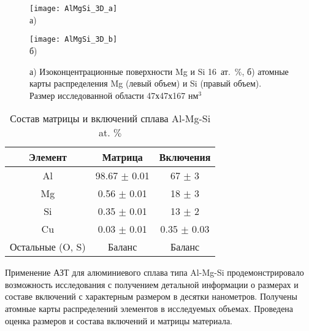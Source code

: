 \begin{figure}[htbp]
	\begin{minipage}[b][][b]{0.49\textwidth}\centering
		\texttt{[image: AlMgSi\_3D\_a]} \\ а)
	\end{minipage}
	\begin{minipage}[b][][b]{0.49\textwidth}\centering
		\texttt{[image: AlMgSi\_3D\_b]} \\ б)
	\end{minipage}
	\caption{а) Изоконцентрационные поверхности Mg и Si 16~ат.~$\%$, б) атомные карты распределения Mg (левый объем) и Si (правый объем). Размер исследованной области 47х47х167 нм$^3$}
	\label{fig:AlMgSi_3D}
\end{figure} 

\begin{table} [htbp]
	\centering
	\caption{Состав матрицы и включений сплава Al-Mg-Si at. $\%$}%
	\label{tab:AlMgSi_table}%
	\begin{SingleSpace}
		\begin{tabular}{| c | c | c |}
			\hline
			Элемент & Матрица & Включения \\ \hline
			Al & 98.67 $\pm$ 0.01 & 67 $\pm$ 3 \\ \hline
			Mg & 0.56 $\pm$ 0.01 & 18 $\pm$ 3 \\ \hline
			Si & 0.35 $\pm$ 0.01 & 13 $\pm$ 2 \\ \hline						
			Cu & 0.03 $\pm$ 0.01 & 0.35 $\pm$ 0.03\\ \hline
			Остальные (O, S) & Баланс & Баланс \\ \hline			
		\end{tabular}%
	\end{SingleSpace}
\end{table}

Применение АЗТ для алюминиевого сплава типа Al-Mg-Si продемонстрировало возможность исследования с получением детальной информации о размерах и составе включений с характерным размером в десятки нанометров. Получены атомные карты распределений элементов в исследуемых объемах. Проведена оценка размеров и состава включений и матрицы материала.

